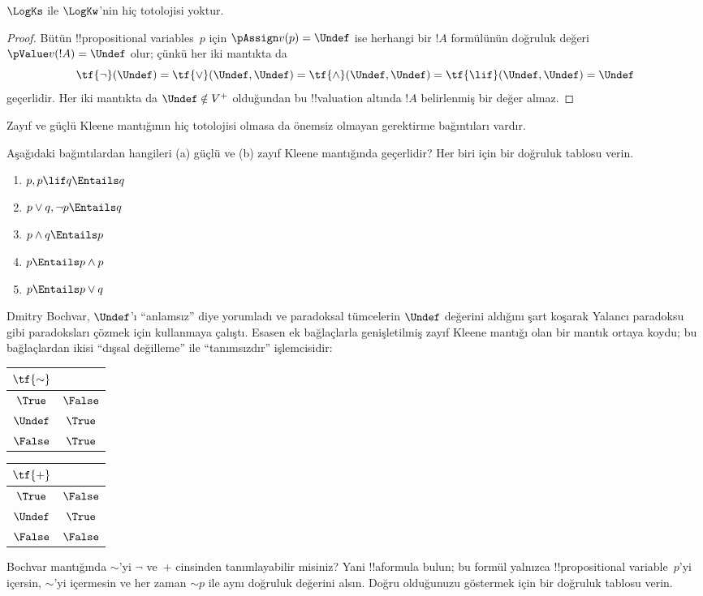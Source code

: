 \documentclass[../../../include/open-logic-section]{subfiles}
\begin{document}
\begin{prop}
  $\LogKs$ ile $\LogKw$'nin hiç totolojisi yoktur.
\end{prop}

\begin{proof}
  Bütün !!{propositional variable}s~$p$ için
  $\pAssign v(p) = \Undef$ ise herhangi bir $!A$ formülünün doğruluk değeri
  $\pValue v(!A) = \Undef$ olur; çünkü her iki mantıkta da
  \[
    \tf{\lnot}(\Undef) = \tf{\lor}(\Undef, \Undef) = \tf{\land}(\Undef,
  \Undef) = \tf{\lif}(\Undef, \Undef) = \Undef
  \]
  geçerlidir. Her iki mantıkta da $\Undef \notin V^+$ olduğundan bu
  !!{valuation} altında $!A$ belirlenmiş bir değer almaz.
\end{proof}

Zayıf ve güçlü Kleene mantığının hiç totolojisi olmasa da önemsiz olmayan
gerektirme bağıntıları vardır.

\begin{prob}
  Aşağıdaki bağıntılardan hangileri (a) güçlü ve (b) zayıf Kleene mantığında
  geçerlidir? Her biri için bir doğruluk tablosu verin.
  \begin{enumerate}
    \item $p, p \lif q \Entails q$
    \item $p \lor q, \lnot p \Entails q$
    \item $p \land q \Entails p$
    \item $p \Entails p \land p$
    \item $p \Entails p \lor q$
  \end{enumerate}
\end{prob}

Dmitry Bochvar, $\Undef$'ı “anlamsız” diye yorumladı ve paradoksal tümcelerin
$\Undef$ değerini aldığını şart koşarak Yalancı paradoksu gibi paradoksları
çözmek için kullanmaya çalıştı. Esasen ek bağlaçlarla genişletilmiş zayıf
Kleene mantığı olan bir mantık ortaya koydu; bu bağlaçlardan ikisi “dışsal
değilleme” ile “tanımsızdır” işlemcisidir:
\begin{center}
  \begin{tabular}{c|c} 
    $\tf{\sim}$ & \\ 
    \hline  
    $\True$ & $\False$ \\ 
    $\Undef$ & $\True$ \\
    $\False$ & $\True$ 
  \end{tabular}
\quad
  \begin{tabular}{c|c} 
    $\tf{+}$ & \\ 
    \hline  
    $\True$ & $\False$ \\ 
    $\Undef$ & $\True$ \\
    $\False$ & $\False$ 
  \end{tabular}
\end{center}

\begin{prob}
  Bochvar mantığında $\sim$'yi $\lnot$ ve~$+$ cinsinden tanımlayabilir
  misiniz? Yani !!a{formula} bulun; bu formül yalnızca
  !!{propositional variable}~$p$'yi içersin, $\sim$'yi içermesin ve her zaman
  $\mathord{\sim}p$ ile aynı doğruluk değerini alsın. Doğru olduğunuzu
  göstermek için bir doğruluk tablosu verin.
\end{prob}
\end{document}
